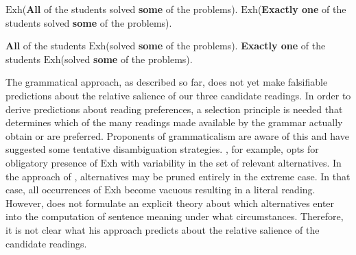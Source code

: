 \documentclass[fleqn,reqno,10pt]{article}
\newcommand{\exh}{\ensuremath{\mathrm{Exh}}}
\renewcommand{\mymark}[1]{\textbf{#1}}
\begin{document}
\begin{exe}
  \ex \label{Grammar-Global}
    \begin{xlist}
      \ex \label{Grammar-Global-AE} \mymark{$\exh$}(\mymark{All} of the students solved
        \mymark{some} of the problems).
      \ex \label{Grammar-Global-GE} \mymark{$\exh$}(\mymark{Exactly one} of the students solved
        \mymark{some} of the problems).
    \end{xlist}
\end{exe}

\begin{exe}
  \ex \label{Grammar-Local}
    \begin{xlist}
      \ex \label{Grammar-Local-AE} \mymark{All} of the students \mymark{$\exh$}(solved
        \mymark{some} of the problems).
      \ex \label{Grammar-Local-GE} \mymark{Exactly one} of the
        students \mymark{$\exh$}(solved
        \mymark{some} of the problems).
    \end{xlist}
\end{exe}

The grammatical approach, as described so far, does not yet make
falsifiable predictions about the relative salience of our three
candidate readings. In order to derive predictions about reading
preferences, a selection principle is needed that determines which of
the many readings made available by the grammar actually obtain or are
preferred. Proponents of grammaticalism are aware of this and have
suggested some tentative disambiguation
strategies. \citet{Magri2011:Another-Argumen}, for example, opts for
obligatory presence of $\exh$ with variability in the set of relevant
alternatives.  In the approach of \citet{Magri2011:Another-Argumen},
alternatives may be pruned entirely in the extreme case. In that case,
all occurrences of $\exh$ become vacuous resulting in a literal
reading. However, \citet{Magri2011:Another-Argumen} does not formulate
an explicit theory about which alternatives enter into the computation
of sentence meaning under what circumstances. Therefore, it is not
clear what his approach predicts about the relative salience of the
candidate readings.
\end{document}

